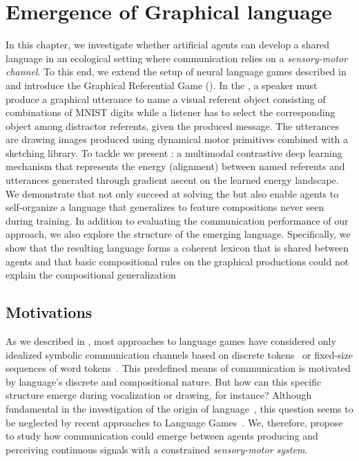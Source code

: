 \chapter{Emergence of Graphical language}
\label{chap:curves}
\minitoc

In this chapter, we investigate whether artificial agents can develop a shared language in an ecological setting where communication relies on a \emph{sensory-motor channel}. To this end, we extend the setup of neural language games described in  and introduce the Graphical Referential Game (\greg). In the \greg, a speaker must produce a graphical utterance to name a visual referent object consisting of combinations of MNIST digits while a listener has to select the corresponding object among distractor referents, given the produced message. The utterances are drawing images produced using dynamical motor primitives combined with a sketching library. To tackle \greg we present \curves: a multimodal contrastive deep learning mechanism that represents the energy (alignment) between named referents and utterances generated through gradient ascent on the learned energy landscape. We demonstrate that \curves not only succeed at solving the \greg but also enable agents to self-organize a language that generalizes to feature compositions never seen during training. In addition to evaluating the communication performance of our approach, we also explore the structure of the emerging language. Specifically, we show that the resulting language forms a coherent lexicon that is shared between agents and that basic compositional rules on the graphical productions could not explain the compositional generalization

\section{Motivations}

\label{sec:intro_curves}

As we described in , most approaches to language games have considered only idealized symbolic communication channels based on discrete tokens~\citep{lazaridou2017multiagent,mordatch2018emergence,chaabouni2021communicating} or fixed-size sequences of word tokens~\citep{havrylov2017emergence,portelance2021emergence}. This predefined means of communication is motivated by language's discrete and compositional nature. But how can this specific structure emerge during vocalization or drawing, for instance? Although fundamental in the investigation of the origin of language~\citep{Dessalles2000,cheney2005constraints,oller2019language}, this question seems to be neglected by recent approaches to Language Games~\citep{moulinfrier2020multi}. We, therefore, propose to study how communication could emerge between agents producing and perceiving continuous signals with a constrained \textit{sensory-motor system}.

